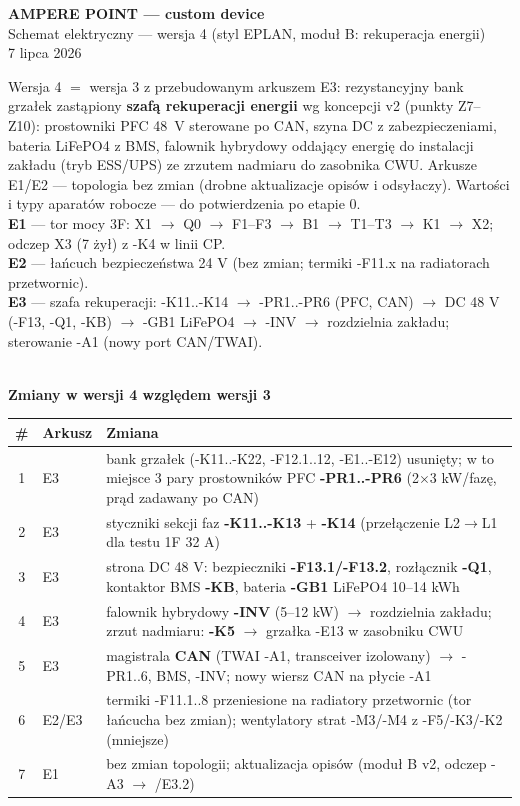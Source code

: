 \documentclass[10pt,a4paper,landscape]{article}
\begin{document}
\begin{center}
\vspace*{1.2cm}
{\LARGE\bfseries AMPERE POINT --- custom device}\\[6pt]
{\Large Schemat elektryczny --- wersja 4 (styl EPLAN, moduł B: rekuperacja energii)}\\[10pt]
{\normalsize 7 lipca 2026}\\[12pt]
\begin{minipage}{0.88\textwidth}\small
Wersja 4 $=$ wersja 3 z przebudowanym arkuszem E3: rezystancyjny bank grzałek zastąpiony
\textbf{szafą rekuperacji energii} wg koncepcji v2 (punkty Z7--Z10): prostowniki PFC 48~V sterowane
po CAN, szyna DC z zabezpieczeniami, bateria LiFePO4 z BMS, falownik hybrydowy oddający energię do
instalacji zakładu (tryb ESS/UPS) ze zrzutem nadmiaru do zasobnika CWU. Arkusze E1/E2 --- topologia
bez zmian (drobne aktualizacje opisów i odsyłaczy). Wartości i typy aparatów robocze --- do
potwierdzenia po etapie 0.\\[6pt]
\textbf{E1} --- tor mocy 3F: X1 $\to$ Q0 $\to$ F1--F3 $\to$ B1 $\to$ T1--T3 $\to$ K1 $\to$ X2; odczep X3 (7 żył) z -K4 w linii CP.\\
\textbf{E2} --- łańcuch bezpieczeństwa 24 V (bez zmian; termiki -F11.x na radiatorach przetwornic).\\
\textbf{E3} --- szafa rekuperacji: -K11..-K14 $\to$ -PR1..-PR6 (PFC, CAN) $\to$ DC 48 V (-F13, -Q1, -KB)
$\to$ -GB1 LiFePO4 $\to$ -INV $\to$ rozdzielnia zakładu; sterowanie -A1 (nowy port CAN/TWAI).
\end{minipage}\\[10pt]
{\small\textbf{Zmiany w wersji 4 względem wersji 3}}\\[3pt]
{\scriptsize
\begin{tabular}{clp{11.6cm}}
\toprule
\# & Arkusz & Zmiana\\
\midrule
1 & E3 & bank grzałek (-K11..-K22, -F12.1..12, -E1..-E12) usunięty; w to miejsce 3 pary prostowników PFC \textbf{-PR1..-PR6} (2$\times$3 kW/fazę, prąd zadawany po CAN)\\
2 & E3 & styczniki sekcji faz \textbf{-K11..-K13} + \textbf{-K14} (przełączenie L2$\to$L1 dla testu 1F 32 A)\\
3 & E3 & strona DC 48 V: bezpieczniki \textbf{-F13.1/-F13.2}, rozłącznik \textbf{-Q1}, kontaktor BMS \textbf{-KB}, bateria \textbf{-GB1} LiFePO4 10--14 kWh\\
4 & E3 & falownik hybrydowy \textbf{-INV} (5--12 kW) $\to$ rozdzielnia zakładu; zrzut nadmiaru: \textbf{-K5} $\to$ grzałka -E13 w zasobniku CWU\\
5 & E3 & magistrala \textbf{CAN} (TWAI -A1, transceiver izolowany) $\to$ -PR1..6, BMS, -INV; nowy wiersz CAN na płycie -A1\\
6 & E2/E3 & termiki -F11.1..8 przeniesione na radiatory przetwornic (tor łańcucha bez zmian); wentylatory strat -M3/-M4 z -F5/-K3/-K2 (mniejsze)\\
7 & E1 & bez zmian topologii; aktualizacja opisów (moduł B v2, odczep -A3 $\to$ /E3.2)\\
\bottomrule
\end{tabular}}
\end{center}
\end{document}
